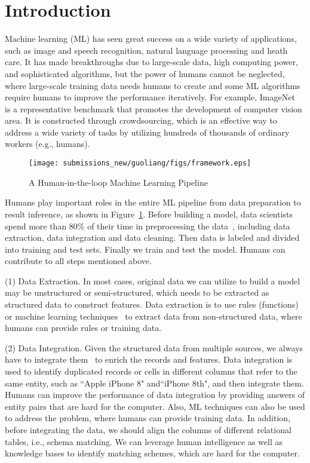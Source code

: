 \section{Introduction}
\label{sec:intro}

Machine learning (ML) has seen great success on a wide variety of applications, such as image and speech recognition, natural language processing and heath care. It has made breakthroughs due to large-scale data, high computing power, and sophisticated algorithms, but the power of humans cannot be neglected, where large-scale training data needs humans to create and some ML algorithms require humans to improve the performance iteratively. For example, ImageNet~\cite{DBLP:imagenet} is a representative benchmark that promotes the development of computer vision area. It is constructed through crowdsourcing, which is an effective way to address a wide variety of tasks by utilizing hundreds of thousands of ordinary workers (e.g., humans).
 
\begin{figure}[h!]
	\centering
	\texttt{[image: submissions\_new/guoliang/figs/framework.eps]}
	\caption{A Human-in-the-loop Machine Learning Pipeline}
	\label{fig:framwork}
\end{figure}

Humans play important roles in the entire ML pipeline from data preparation to result inference, as shown in Figure~\ref{fig:framwork}. Before building a model, data scientists spend more than 80\% of their time in preprocessing the data~\cite{clean}, including data extraction, data integration and data cleaning. Then data is labeled and divided into training and test sets. Finally we train and test the model. Humans can contribute to all steps mentioned above.


(1) Data Extraction. In most cases,  original data we can utilize to build a model may be unstructured or semi-structured, which needs to be extracted as structured data to construct features. Data extraction is to use rules (functions) or machine learning techniques~\cite{DBLP:conf/acl/LiRC11,DBLP:conf/wsdm/NakasholeTW11, DBLP:conf/aaai/MitchellCHTBCMG15} to extract data from non-structured data, where humans can provide rules or training data. 


(2) Data Integration.  Given the structured data from multiple sources, we always have to integrate them~\cite{DBLP:journals/vldb/ChaiLLDF18,DBLP:transitivity, DBLP:crowder} to enrich the records and features. 
Data integration is used to identify duplicated records or cells in different columns that refer to the same entity, such as ``Apple iPhone 8" and``iPhone 8th", and then integrate them. 
Humans can improve the performance of data integration by providing answers of entity pairs that are hard for the computer. Also, ML techniques can also be used to address the problem, where humans can provide training data. In addition, before integrating the data, we should align the columns of different relational tables, i.e., schema matching. We can leverage human intelligence as well as knowledge bases to identify matching schemes, which are hard for the computer.

